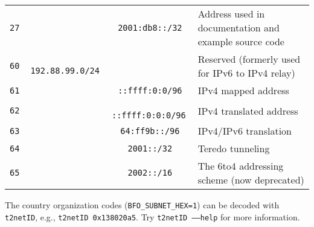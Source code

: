 \documentclass[documentation]{subfiles}
\begin{document}
\begin{center}
\begin{tabular}{>{\tt}r>{\tt}c>{\tt}cl}
        27       &                      & 2001:db8::/32        & Address used in documentation and example source code\\
        60       & 192.88.99.0/24       &                      & Reserved (formerly used for IPv6 to IPv4 relay)\\
        61       &                      & ::ffff:0:0/96        & IPv4 mapped address\\
        62       &                      & ::ffff:0:0:0/96      & IPv4 translated address\\
        63       &                      & 64:ff9b::/96         & IPv4/IPv6 translation\\
        64       &                      & 2001::/32            & Teredo tunneling\\
        65       &                      & 2002::/16            & The 6to4 addressing scheme (now deprecated)\\
        \bottomrule
    \end{tabular}
\end{center}

The country organization codes ({\tt BFO\_SUBNET\_HEX=1}) can be decoded with {\tt t2netID}, e.g., {\tt t2netID 0x138020a5}.
Try {\tt t2netID --{}--help} for more information.
\end{document}
